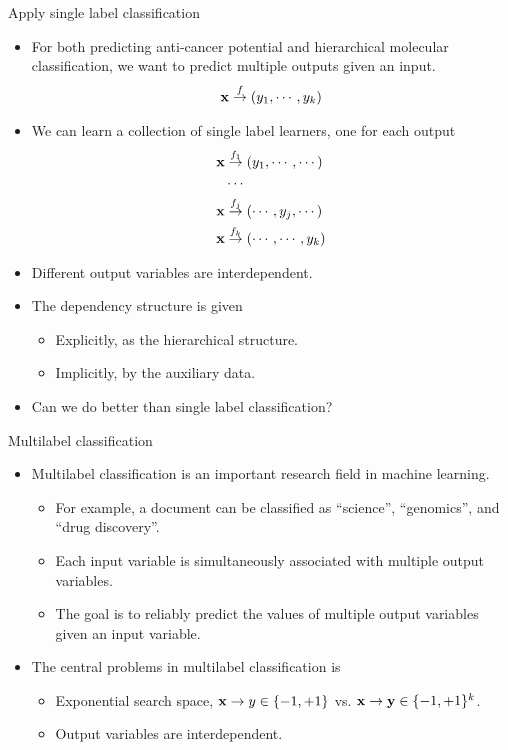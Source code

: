 \documentclass[first=dgreen,second=purple,logo=yellowexc]{aaltoslides}
\begin{document}
{\begin{frame}{Apply single label classification}
	\begin{itemize}
		\item For both predicting anti-cancer potential and hierarchical molecular classification, we want to predict multiple outputs given an input.
		\begin{align*}
			\mathbf {x} \overset{f}{\rightarrow} (y_{1},\cdots,y_{k})
		\end{align*}
		\item We can learn a collection of single label learners, one for each output
		\begin{align*}
			\mathbf {x} &\overset{f_1}{\rightarrow} (y_{1},\cdots,\cdots)\\
			&\cdots\\
			\mathbf {x} &\overset{f_j}{\rightarrow} (\cdots,y_{j},\cdots)\\
			\mathbf {x} &\overset{f_k}{\rightarrow} (\cdots,\cdots,y_{k})\\
		\end{align*}
		\item Different output variables are interdependent.
		\item The dependency structure is given
		\begin{itemize}
			\footnotesize
			\item Explicitly, as the hierarchical structure.
			\item Implicitly, by the auxiliary data.
		\end{itemize}
		\item Can we do better than single label classification?
	\end{itemize}
\end{frame}

\begin{frame}{Multilabel classification}
	\begin{itemize}
		\item Multilabel classification is an important research field in machine learning.
		\begin{itemize}
			\footnotesize
			\item For example, a document can be classified as “science”, “genomics”, and “drug discovery”.
			\item Each input variable is simultaneously associated with multiple output variables.
			\item The goal is to reliably predict the values of multiple output variables given an input variable.
		\end{itemize}
		\item The central problems in multilabel classification is 
		\begin{itemize}
			\footnotesize
			\item Exponential search space, $\mathbf {x}\rightarrow y\in\{-1,+1\}$ vs. $\mathbf {x}\rightarrow \mathbf {y}\in\{-1,+1\}^k$.
			\item Output variables are interdependent.
		\end{itemize}
	\end{itemize}
\end{frame}

}
\end{document}
